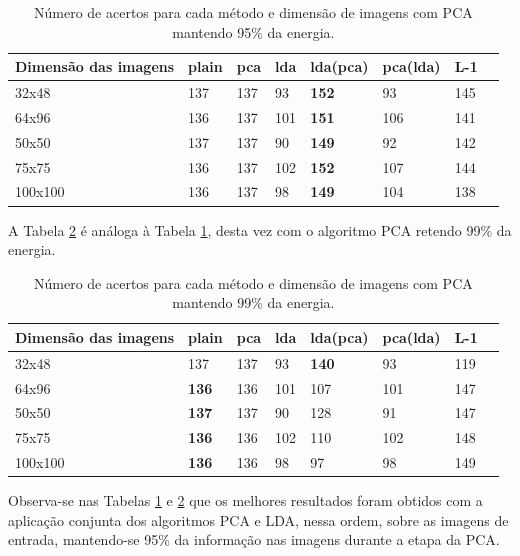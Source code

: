 \documentclass[10pt,twocolumn,letterpaper]{article}
\begin{document}
\begin{table}
\begin{center}
\begin{tabular}{ | l | l | l | l | l | l | l | p{3.5cm} |}
\hline
Dimensão das imagens & plain & pca & lda & lda(pca) & pca(lda) & L-1 \\
\hline
32x48 & 137 & 137 & 93 & \textbf{152} & 93 & 145 \\
64x96 & 136 & 137 & 101 & \textbf{151} & 106 & 141 \\
50x50 & 137 & 137 & 90 & \textbf{149} & 92 & 142 \\
75x75 & 136 & 137 & 102 & \textbf{152} & 107 & 144 \\
100x100 & 136 & 137 & 98 & \textbf{149} & 104 & 138 \\
\hline
\end{tabular}
\end{center}
\caption{Número de acertos para cada método e dimensão de imagens com PCA mantendo 95\% da energia.}
\label{tbl-95}
\end{table}

A Tabela \ref{tbl-99} é análoga à Tabela \ref{tbl-95}, desta vez com o algoritmo PCA retendo 99\% da energia.

\begin{table}
\begin{center}
\begin{tabular}{ | l | l | l | l | l | l | l | p{3.5cm} |}
\hline
Dimensão das imagens & plain & pca & lda & lda(pca) & pca(lda) & L-1 \\
\hline
32x48 & 137 & 137 & 93 & \textbf{140} & 93 & 119 \\
64x96 & \textbf{136} & 136 & 101 & 107 & 101 & 147 \\
50x50 & \textbf{137} & 137 & 90 & 128 & 91 & 147 \\
75x75 & \textbf{136} & 136 & 102 & 110 & 102 & 148 \\
100x100 & \textbf{136} & 136 & 98 & 97 & 98 & 149 \\
\hline
\end{tabular}
\end{center}
\caption{Número de acertos para cada método e dimensão de imagens com PCA mantendo 99\% da energia.}
\label{tbl-99}
\end{table}

Observa-se nas Tabelas \ref{tbl-95} e \ref{tbl-99} que os melhores resultados foram obtidos com a aplicação conjunta dos algoritmos PCA e LDA, nessa ordem, sobre as imagens de entrada, mantendo-se 95\% da informação nas imagens durante a etapa da PCA.
\end{document}
